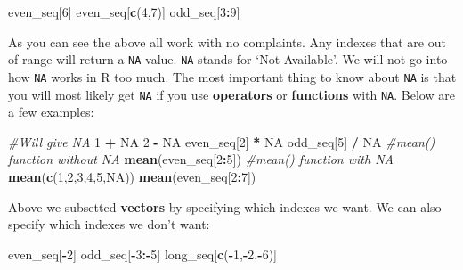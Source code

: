 \documentclass[]{book}
\newenvironment{Shaded}{\begin{snugshade}}{\end{snugshade}}
\newcommand{\KeywordTok}[1]{\textcolor[rgb]{0.13,0.29,0.53}{\textbf{#1}}}
\newcommand{\DecValTok}[1]{\textcolor[rgb]{0.00,0.00,0.81}{#1}}
\newcommand{\StringTok}[1]{\textcolor[rgb]{0.31,0.60,0.02}{#1}}
\newcommand{\CommentTok}[1]{\textcolor[rgb]{0.56,0.35,0.01}{\textit{#1}}}
\newcommand{\OtherTok}[1]{\textcolor[rgb]{0.56,0.35,0.01}{#1}}
\newcommand{\OperatorTok}[1]{\textcolor[rgb]{0.81,0.36,0.00}{\textbf{#1}}}
\newcommand{\NormalTok}[1]{#1}
\begin{document}
\begin{Shaded}
\begin{Highlighting}[]
\NormalTok{even_seq[}\DecValTok{6}\NormalTok{]}
\NormalTok{even_seq[}\KeywordTok{c}\NormalTok{(}\DecValTok{4}\NormalTok{,}\DecValTok{7}\NormalTok{)]}
\NormalTok{odd_seq[}\DecValTok{3}\OperatorTok{:}\DecValTok{9}\NormalTok{]}
\end{Highlighting}
\end{Shaded}

As you can see the above all work with no complaints. Any indexes that
are out of range will return a \texttt{NA} value. \texttt{NA} stands for
`Not Available'. We will not go into how \texttt{NA} works in R too
much. The most important thing to know about \texttt{NA} is that you
will most likely get \texttt{NA} if you use \textbf{operators} or
\textbf{functions} with \texttt{NA}. Below are a few examples:

\begin{Shaded}
\begin{Highlighting}[]
\CommentTok{#Will give NA}
\DecValTok{1} \OperatorTok{+}\StringTok{ }\OtherTok{NA}
\DecValTok{2} \OperatorTok{-}\StringTok{ }\OtherTok{NA}
\NormalTok{even_seq[}\DecValTok{2}\NormalTok{] }\OperatorTok{*}\StringTok{ }\OtherTok{NA}
\NormalTok{odd_seq[}\DecValTok{5}\NormalTok{] }\OperatorTok{/}\StringTok{ }\OtherTok{NA}
\CommentTok{#mean() function without NA}
\KeywordTok{mean}\NormalTok{(even_seq[}\DecValTok{2}\OperatorTok{:}\DecValTok{5}\NormalTok{])}
\CommentTok{#mean() function with NA}
\KeywordTok{mean}\NormalTok{(}\KeywordTok{c}\NormalTok{(}\DecValTok{1}\NormalTok{,}\DecValTok{2}\NormalTok{,}\DecValTok{3}\NormalTok{,}\DecValTok{4}\NormalTok{,}\DecValTok{5}\NormalTok{,}\OtherTok{NA}\NormalTok{))}
\KeywordTok{mean}\NormalTok{(even_seq[}\DecValTok{2}\OperatorTok{:}\DecValTok{7}\NormalTok{])}
\end{Highlighting}
\end{Shaded}

Above we subsetted \textbf{vectors} by specifying which indexes we want.
We can also specify which indexes we don't want:

\begin{Shaded}
\begin{Highlighting}[]
\NormalTok{even_seq[}\OperatorTok{-}\DecValTok{2}\NormalTok{]}
\NormalTok{odd_seq[}\OperatorTok{-}\DecValTok{3}\OperatorTok{:-}\DecValTok{5}\NormalTok{]}
\NormalTok{long_seq[}\KeywordTok{c}\NormalTok{(}\OperatorTok{-}\DecValTok{1}\NormalTok{,}\OperatorTok{-}\DecValTok{2}\NormalTok{,}\OperatorTok{-}\DecValTok{6}\NormalTok{)]}
\end{Highlighting}
\end{Shaded}
\end{document}
